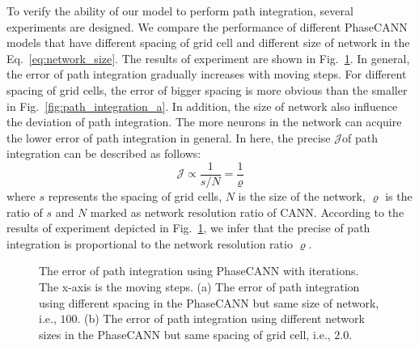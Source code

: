 \documentclass[preprint,12pt]{elsarticle}
\begin{document}
To verify the ability of our model to perform path integration, several experiments are designed. We compare the performance of different PhaseCANN models that have different spacing of grid cell and different size of network in the Eq.~\eqref{eq:network_size}. The results of experiment are shown in Fig.~\ref{fig:path_integration}. In general, the error of path integration gradually increases with moving steps. For different spacing of grid cells, the error of bigger spacing is more obvious than the smaller in Fig.~\ref{fig:path_integration_a}. In addition, the size of network also influence the 
deviation of path integration. The more neurons in the network can acquire the lower error of path integration in general. In here, the precise $\mathcal{J}$of path integration can be described as follows:
\begin{equation}\label{eq:relation_precise}
	\mathcal{J} \varpropto \frac{1}{s/N} = \frac{1}{\varrho}
\end{equation}
where $s$ represents the spacing of grid cells, $N$ is the size of the network, $\varrho$ is the ratio of $s$ and $N$ marked as network resolution ratio of CANN. According to the results of experiment depicted in Fig.~\ref{fig:path_integration}, we infer that the precise of path integration is proportional to the network resolution ratio $\varrho$. 

\begin{figure}[!t]
	\centering

	\vspace{-10pt}
	
	\caption{The error of path integration using PhaseCANN with iterations. The x-axis is the moving steps. (a) The error of path integration using different spacing in the PhaseCANN but same size of network, i.e., $100$. (b) The error of path integration using different network sizes in the PhaseCANN but same spacing of grid cell, i.e., $2.0$. }
	\label{fig:path_integration}
\end{figure}
\end{document}
